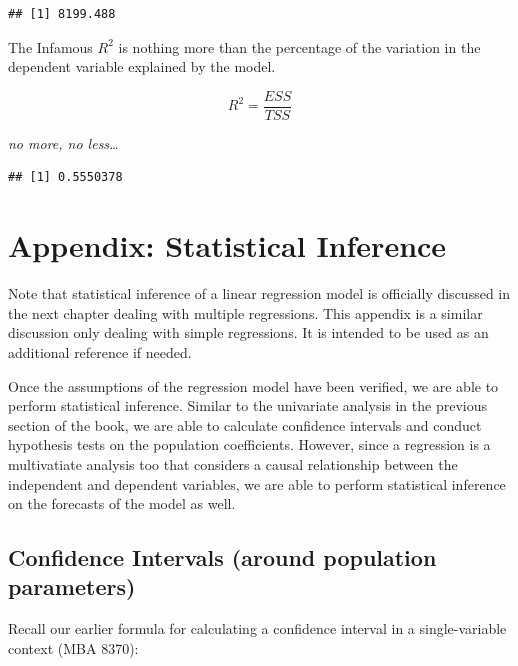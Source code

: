 \documentclass[
]{book}
\newenvironment{Shaded}{\begin{snugshade}}{\end{snugshade}}
\newcommand{\FunctionTok}[1]{\textcolor[rgb]{0.13,0.29,0.53}{\textbf{#1}}}
\newcommand{\NormalTok}[1]{#1}
\newcommand{\SpecialCharTok}[1]{\textcolor[rgb]{0.81,0.36,0.00}{\textbf{#1}}}
\begin{document}
\begin{verbatim}
## [1] 8199.488
\end{verbatim}

The Infamous \(R^2\) is nothing more than the percentage of the variation in the dependent variable explained by the model.

\[R^2 = \frac{ESS}{TSS}\]

\emph{no more, no less\ldots{}}

\begin{Shaded}
\end{Shaded}

\begin{verbatim}
## [1] 0.5550378
\end{verbatim}

\section{Appendix: Statistical Inference}\label{appendix-statistical-inference}

Note that statistical inference of a linear regression model is officially discussed in the next chapter dealing with multiple regressions. This appendix is a similar discussion only dealing with simple regressions. It is intended to be used as an additional reference if needed.

Once the assumptions of the regression model have been verified, we are able to perform statistical inference. Similar to the univariate analysis in the previous section of the book, we are able to calculate confidence intervals and conduct hypothesis tests on the population coefficients. However, since a regression is a multivatiate analysis too that considers a causal relationship between the independent and dependent variables, we are able to perform statistical inference on the forecasts of the model as well.

\subsection{Confidence Intervals (around population parameters)}\label{confidence-intervals-around-population-parameters}

Recall our earlier formula for calculating a confidence interval in a single-variable context (MBA 8370):
\end{document}
